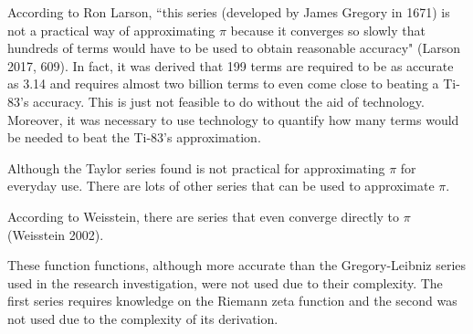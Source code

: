 According to Ron Larson, ``this series (developed by James Gregory in 1671) is not a practical way of approximating \(\pi\) because it converges so slowly that hundreds of terms would have to be used to obtain reasonable accuracy" (Larson 2017, 609). In fact, it was derived that 199 terms are required to be as accurate as 3.14 and requires almost two billion terms to even come close to beating a Ti-83's accuracy. This is just not feasible to do without the aid of technology. Moreover, it was necessary to use technology to quantify how many terms would be needed to beat the Ti-83's approximation.

Although the Taylor series found is not practical for approximating \(\pi\) for everyday use. There are lots of other series that can be used to approximate \(\pi\). 

According to Weisstein, there are series that even converge directly to \(\pi\) (Weisstein 2002).


These function functions, although more accurate than the Gregory-Leibniz series used in the research investigation, were not used due to their complexity. The first series requires knowledge on the Riemann zeta function and the second was not used due to the complexity of its derivation.


